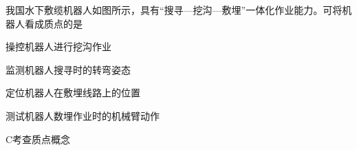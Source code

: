 我国水下敷缆机器人如图所示，具有“搜寻—挖沟—敷埋”一体化作业能力。可将机器人看成质点的是\paren[]
\begin{choices}
	\item 操控机器人进行挖沟作业
	\item 监测机器人搜寻时的转弯姿态
	\item 定位机器人在敷埋线路上的位置
	\item 测试机器人数埋作业时的机械臂动作
\end{choices}
\begin{answer}
	C\qquad 考查质点概念
\end{answer}